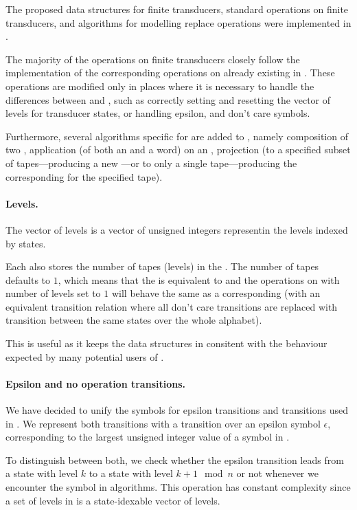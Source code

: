 The proposed data structures for finite transducers, standard operations on finite transducers, and algorithms for modelling replace operations were implemented in \mata.

The majority of the operations on finite transducers closely follow the implementation of the corresponding operations on \nfas already existing in \mata.
These operations are modified only in places where it is necessary to handle the differences between \nfas and \nfts, such as correctly setting and resetting the vector of levels for transducer states, or handling epsilon, \nop and don't care symbols.

Furthermore, several algorithms specific for \nfts are added to \mata, namely composition of two \nfts, application (of both an \nfa and a word) on an \nft, projection (to a specified subset of \nft tapes---producing a new \nft---or to only a single tape---producing the corresponding \nfa for the specified tape).

\paragraph{Levels.}
The vector of levels is a vector of unsigned integers representin the levels indexed by states.

Each \nft also stores the number of tapes (levels) in the \nft.
The number of tapes defaults to $1$, which means that the \nft is equivalent to \nfa and the operations on \nfts with number of levels set to $1$ will behave the same as a corresponding \nfa (with an equivalent transition relation where all don't care transitions are replaced with transition between the same states over the whole alphabet).

This is useful as it keeps the data structures in \mata consitent with the behaviour expected by many potential users of \mata.

\paragraph{Epsilon and no operation transitions.}
We have decided to unify the symbols for epsilon transitions and \nop transitions used in \mata.
We represent both transitions with a transition over an epsilon symbol $\epsilon$, corresponding to the largest unsigned integer value of a symbol in \mata.

To distinguish between both, we check whether the epsilon transition leads from a state with level $k$ to a state with level $k + 1 \mod n$ or not whenever we encounter the symbol in algorithms.
This operation has constant complexity since a set of levels in \mata is a state-idexable vector of levels.

